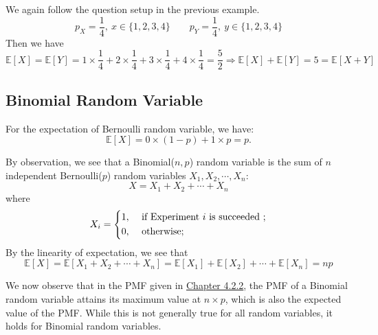 \begin{eg}
    We again follow the question setup in the previous example.
    \[
        p_X = \dfrac{1}{4},\ x \in \{1, 2, 3, 4\} \quad\quad p_Y = \dfrac{1}{4},\ y \in \{1, 2, 3, 4\}
    \]
    Then we have 
    \[
        \mathbb{E}[X] = \mathbb{E}[Y] = 1 \times \dfrac{1}{4} + 2 \times \dfrac{1}{4} + 3 \times \dfrac{1}{4} + 4 \times \dfrac{1}{4} = \dfrac{5}{2} \Longrightarrow \mathbb{E}[X] + \mathbb{E}[Y] = 5 = \mathbb{E}[X + Y]
    \]
\end{eg}

\subsection{Binomial Random Variable}
For the expectation of Bernoulli random variable, we have:
\[
    \mathbb{E}[X] = 0 \times (1 - p) + 1 \times p = p. 
\]

By observation, we see that a Binomial(\(n, p\)) random variable is the sum of \(n\) independent Bernoulli(\(p\)) random variables \(X_1, X_2, \cdots, X_n\):
\[
    X = X_1 + X_2 + \cdots + X_n
\]
where
\[
    X_i = \begin{dcases}
        1, &\text{ if Experiment \(i\) is succeeded }  ;\\
        0, &\text{ otherwise}  ;
    \end{dcases}
\]
By the linearity of expectation, we see that 
\[
    \mathbb{E}[X] = \mathbb{E}[X_1 + X_2 + \cdots + X_n] = \mathbb{E}[X_1] + \mathbb{E}[X_2] + \cdots + \mathbb{E}[X_n] = np
\]

We now observe that in the PMF given in \hyperlink{page.17}{Chapter 4.2.2}, the PMF of a Binomial random variable attains its maximum value at \(n \times p\), which is also the expected value of the PMF. While this is not generally true for all random variables, it holds for Binomial random variables.

